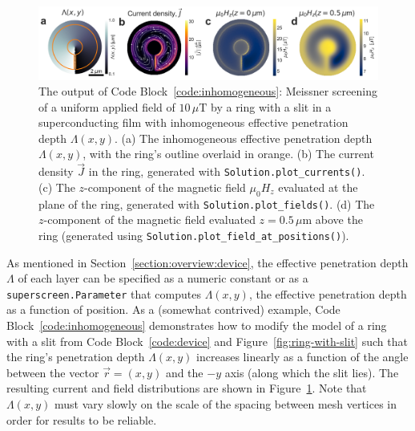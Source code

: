 \documentclass[final,3p,times,twocolumn]{elsarticle}
\newcommand{\inline}[1]{\texttt{#1}\xspace}
\newcommand{\um}{\mu\mathrm{m}}
\begin{document}
\begin{figure}[h!]
    \centering
    \includegraphics[width=\textwidth]{examples/images/ring_with_slit_inhomogeneous.pdf}
    \caption{The output of Code Block~\ref{code:inhomogeneous}: Meissner screening of a uniform applied field of $10\,\mu\mathrm{T}$ by a ring with a slit in a superconducting film with inhomogeneous effective penetration depth $\Lambda(x, y)$. (a) The inhomogeneous effective penetration depth $\Lambda(x, y)$, with the ring's outline overlaid in orange. (b) The current density $\vec{J}$ in the ring, generated with \inline{Solution.plot_currents()}. (c) The $z$-component of the magnetic field $\mu_0H_z$ evaluated at the plane of the ring, generated with \inline{Solution.plot_fields()}. (d) The $z$-component of the magnetic field evaluated $z=0.5\,\um$ above the ring (generated using \inline{Solution.plot_field_at_positions()}).}
    \label{fig:inhomogeneous}
\end{figure}

As mentioned in Section~\ref{section:overview:device}, the effective penetration depth $\Lambda$ of each layer can be specified as a numeric constant or as a \inline{superscreen.Parameter} that computes $\Lambda(x, y)$, the effective penetration depth as a function of position. As a (somewhat contrived) example, Code Block~\ref{code:inhomogeneous} demonstrates how to modify the model of a ring with a slit from Code Block~\ref{code:device} and Figure~\ref{fig:ring-with-slit} such that the ring's penetration depth $\Lambda(x, y)$ increases linearly as a function of the angle between the vector $\vec{r} = (x, y)$ and the $-y$ axis (along which the slit lies). The resulting current and field distributions are shown in Figure~\ref{fig:inhomogeneous}. Note that $\Lambda(x, y)$ must vary slowly on the scale of the spacing between mesh vertices in order for results to be reliable.
 
\end{document}
